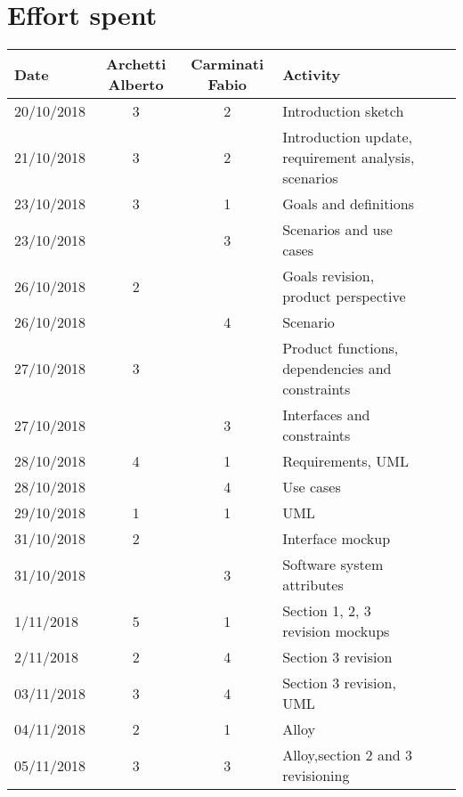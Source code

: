 
\section{Effort spent}

\label{sec:effort}

\begin{table}[h!]
\centering
\begin{tabularx}{\linewidth}{lc|c|X|Xl}
\hline
\textbf{Date}  & \textbf{Archetti Alberto} & \textbf{Carminati Fabio} & \textbf{Activity}                                \\ 
\hline
20/10/2018  & 3 & 2 & Introduction sketch                                             \\ 
\hline
21/10/2018 & 3 & 2 & Introduction update, requirement analysis, scenarios          \\ 
\hline
23/10/2018 & 3 & 1 & Goals and definitions                                             \\
 \hline
23/10/2018 & & 3 & Scenarios and use cases                                         \\
\hline
26/10/2018 & 2 & & Goals revision, product perspective          \\ 
\hline
26/10/2018 & & 4 & Scenario                                                         \\
 \hline
27/10/2018 & 3 & & Product functions, dependencies and constraints              \\
\hline
27/10/2018 & & 3 &Interfaces and constraints                                        \\ 
\hline
28/10/2018 & 4 & 1 & Requirements, UML                                               \\
 \hline
28/10/2018 & & 4 & Use cases                                                        \\ 
\hline
29/10/2018 &1 &1 &UML                                                             \\ 
\hline
31/10/2018 & 2 & & Interface mockup                                                \\ 
\hline
31/10/2018 & &3 & Software system attributes                                        \\
 \hline
1/11/2018 & 5 & 1& Section 1, 2, 3 revision mockups \\
 \hline
2/11/2018 & 2 & 4 &Section 3 revision                                                \\ 
\hline
03/11/2018 & 3 & 4 &Section 3 revision, UML                                       \\ 
\hline
04/11/2018 &2 & 1 &Alloy                                                             \\ 
\hline
05/11/2018 & 3 &3 &Alloy,section 2 and 3 revisioning       \\ 
\hline


\end{tabularx}

\end{table}







